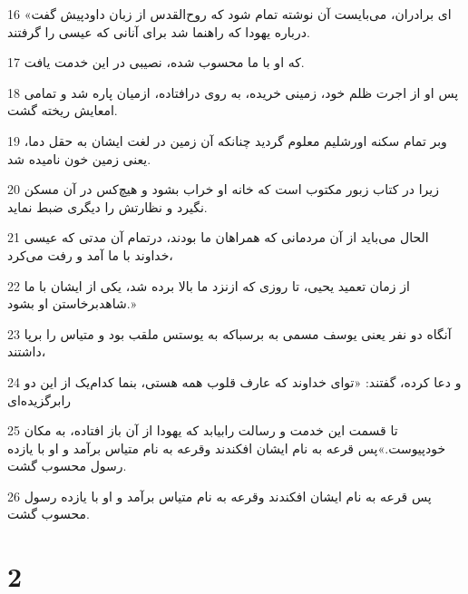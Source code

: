 \par 16 «ای برادران، می‌بایست آن نوشته تمام شود که روح‌القدس از زبان داودپیش گفت درباره یهودا که راهنما شد برای آنانی که عیسی را گرفتند.
\par 17 که او با ما محسوب شده، نصیبی در این خدمت یافت.
\par 18 پس او از اجرت ظلم خود، زمینی خریده، به روی درافتاده، ازمیان پاره شد و تمامی امعایش ریخته گشت.
\par 19 وبر تمام سکنه اورشلیم معلوم گردید چنانکه آن زمین در لغت ایشان به حقل دما، یعنی زمین خون نامیده شد.
\par 20 زیرا در کتاب زبور مکتوب است که خانه او خراب بشود و هیچ‌کس در آن مسکن نگیرد و نظارتش را دیگری ضبط نماید.
\par 21 الحال می‌باید از آن مردمانی که همراهان ما بودند، درتمام آن مدتی که عیسی خداوند با ما آمد و رفت می‌کرد،
\par 22 از زمان تعمید یحیی، تا روزی که ازنزد ما بالا برده شد، یکی از ایشان با ما شاهدبرخاستن او بشود.»
\par 23 آنگاه دو نفر یعنی یوسف مسمی به برسباکه به یوستس ملقب بود و متیاس را برپا داشتند،
\par 24 و دعا کرده، گفتند: «تو‌ای خداوند که عارف قلوب همه هستی، بنما کدام‌یک از این دو رابرگزیده‌ای
\par 25 تا قسمت این خدمت و رسالت رابیابد که یهودا از آن باز افتاده، به مکان خودپیوست.»پس قرعه به نام ایشان افکندند وقرعه به نام متیاس برآمد و او با یازده رسول محسوب گشت.
\par 26 پس قرعه به نام ایشان افکندند وقرعه به نام متیاس برآمد و او با یازده رسول محسوب گشت.

\chapter{2}

